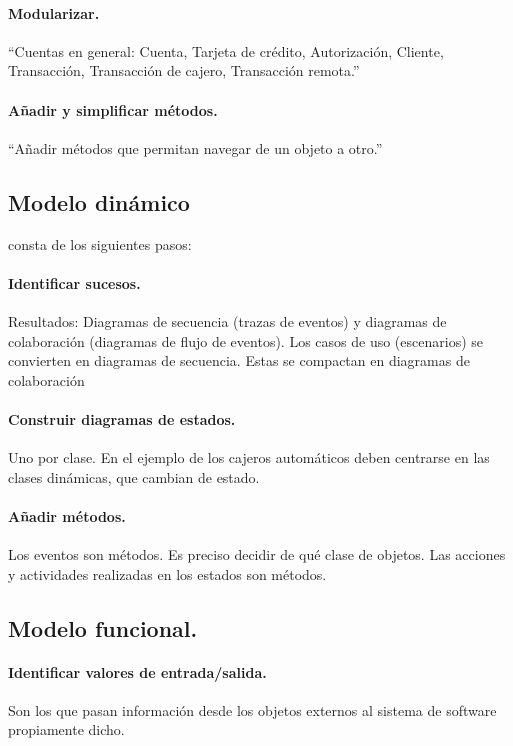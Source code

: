 \documentclass[spanish,12pt,letterpapper]{article}
\begin{document}
	\paragraph{Modularizar.} ``Cuentas en general: Cuenta, Tarjeta de crédito, Autorización, Cliente, Transacción, Transacción de cajero, Transacción remota.''
	
	\paragraph{Añadir y simplificar métodos.} ``Añadir métodos que permitan navegar de un objeto a otro.''\\
	
	\subsection{Modelo dinámico}
	consta de los siguientes pasos:
	
	\paragraph{Identificar sucesos.} Resultados: Diagramas de secuencia (trazas de eventos) y diagramas de colaboración (diagramas de flujo de eventos). Los casos de uso (escenarios) se convierten en diagramas de secuencia. Estas se compactan en diagramas de colaboración
	
	\paragraph{Construir diagramas de estados.} Uno por clase. En el ejemplo de los cajeros automáticos deben centrarse en las clases dinámicas, que cambian de estado.
	
	\paragraph{Añadir métodos.} Los eventos son métodos. Es preciso decidir de qué clase de objetos. Las acciones y actividades realizadas en los estados son métodos.\\
	
	\subsection{Modelo funcional.}
	
	\paragraph{Identificar valores de entrada/salida.} Son los que pasan información desde los objetos externos al sistema de software propiamente dicho.
\end{document}

